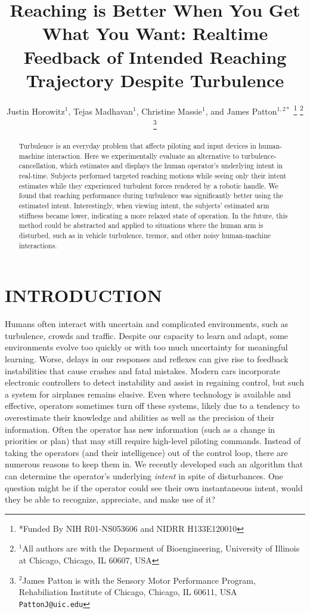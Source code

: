 \documentclass[letterpaper, 10 pt, conference]{ieeeconf}  %
\title{\LARGE \bf
Reaching is Better When You Get What You Want: Realtime Feedback of Intended Reaching Trajectory Despite Turbulence
}
\author{Justin Horowitz$^{1}$, Tejas Madhavan$^{1}$, Christine Massie$^{1}$, and James Patton$^{1,2*}$%
\thanks{*Funded By NIH R01-NS053606 and NIDRR H133E120010}%
\thanks{$^{1}$All authors are with the Deparment of Bioengineering, University of Illinois at Chicago, 
		Chicago, IL 60607, USA 
		}
\thanks{$^{2}$James Patton is with the Sensory Motor Performance Program, Rehabiliation Institute of Chicago,
       Chicago, IL 60611, USA
       {\tt\small PattonJ@uic.edu}}%
}
\begin{document}
\maketitle
\thispagestyle{empty}
\pagestyle{empty}


\begin{abstract}
Turbulence is an everyday problem that affects piloting and input devices in human-machine interaction. Here we experimentally evaluate an alternative to turbulence-cancellation, which estimates and displays the human operator's underlying intent in real-time. Subjects performed targeted reaching motions while seeing only their intent estimates while they experienced turbulent forces rendered by a robotic handle. We found that reaching performance during turbulence was significantly better using the estimated intent. Interestingly, when viewing intent, the subjects' estimated arm stiffness became lower, indicating a more relaxed state of operation. In the future, this method could be abstracted and applied to situations where the human arm is disturbed, such as in vehicle turbulence, tremor, and other noisy human-machine interactions.
\end{abstract}


\section{INTRODUCTION}

Humans often interact with uncertain and complicated environments, such as turbulence, crowds and traffic. Despite our capacity to learn and adapt, some environments evolve too quickly or with too much uncertainty for meaningful learning. Worse, delays in our responses and reflexes can give rise to feedback instabilities that cause crashes and fatal mistakes\cite{mcruer1995pilot}. Modern cars incorporate electronic controllers to detect instability and assist in regaining control\cite{lie2006effectiveness}, but such a system for airplanes remains elusive\cite{newman2012thirty}. Even where technology is available and effective, operators sometimes turn off these systems\cite{itoh2013evaluation}, likely due to a tendency to overestimate their knowledge and abilities as well as the precision of their information\cite{del2012decision}. Often the operator has new information (such as a change in priorities or plan) that may still require high-level piloting commands. Instead of taking the operators (and their intelligence) out of the control loop, there are numerous reasons to keep them in. We recently developed such an algorithm \cite{horowitz2015determining} that can determine the operator's underlying \textit{intent} in spite of disturbances. One question might be if the operator could see their own instantaneous intent, would they be able to recognize, appreciate, and make use of it? 
\end{document}
